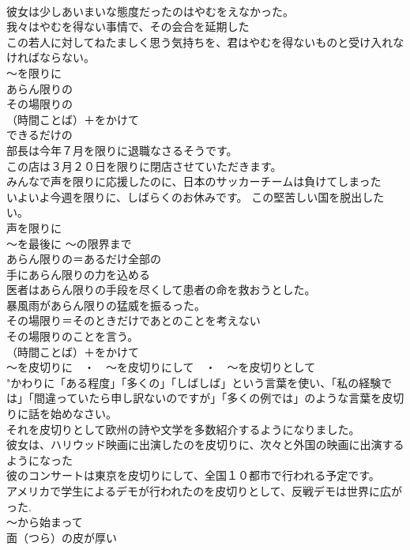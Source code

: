 \documentclass[8pt]{extreport}
\begin{document}
\begin{CJK}{UTF8}{min}
\\	彼女は少しあいまいな態度だったのはやむをえなかった。 
\\	我々はやむを得ない事情で、その会合を延期した 
\\	この若人に対してねたましく思う気持ちを、君はやむを得ないものと受け入れなければならない。 
\\	～を限りに 
\\	あらん限りの 
\\	その場限りの 
\\	（時間ことば）＋をかけて	
\\	できるだけの 
\\	部長は今年７月を限りに退職なさるそうです。 
\\	この店は３月２０日を限りに閉店させていただきます。
\\	みんなで声を限りに応援したのに、日本のサッカーチームは負けてしまった 
\\	いよいよ今週を限りに、しばらくのお休みです。 この堅苦しい国を脱出したい。 
\\	声を限りに 
\\	～を最後に ～の限界まで 
\\	あらん限りの＝あるだけ全部の 
\\	手にあらん限りの力を込める 
\\	医者はあらん限りの手段を尽くして患者の命を救おうとした。 
\\	暴風雨があらん限りの猛威を振るった。 
\\	その場限り＝そのときだけであとのことを考えない 
\\	その場限りのことを言う。 
\\	（時間ことば）＋をかけて 
\\	～を皮切りに　・　～を皮切りにして　・　～を皮切りとして	
\\	"かわりに「ある程度」「多くの」「しばしば」という言葉を使い、「私の経験では」「間違っていたら申し訳ないのですが」「多くの例では」のような言葉を皮切りに話を始めなさい。 
\\	それを皮切りとして欧州の詩や文学を多数紹介するようになりました。 
\\	彼女は、ハリウッド映画に出演したのを皮切りに、次々と外国の映画に出演するようになった 
\\	彼のコンサートは東京を皮切りにして、全国１０都市で行われる予定です。
\\	アメリカで学生によるデモが行われたのを皮切りとして、反戦デモは世界に広がった. 
\\	～から始まって 
\\	面（つら）の皮が厚い　 

\end{CJK}
\end{document}
